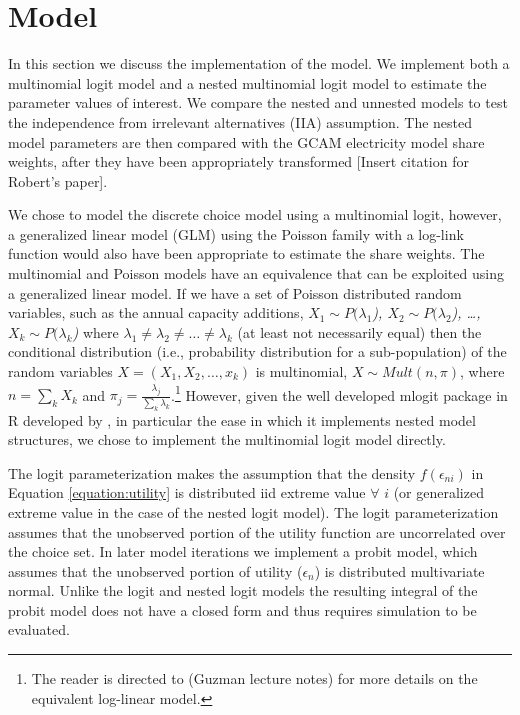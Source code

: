 \documentclass[10pt]{amsart}
\begin{document}
\section{Model}
In this section we discuss the implementation of the model.
We implement both a multinomial logit model and a nested multinomial logit model to estimate the parameter values of interest. 
We compare the nested and unnested models to test the independence from irrelevant alternatives (IIA) assumption.
The nested model parameters are then compared with the GCAM electricity model share weights, after they have been appropriately transformed \parencite{}[Insert citation for Robert's paper].

We chose to model the discrete choice model using a  multinomial logit, however, a generalized linear model (GLM) using the Poisson family with a log-link function would also have been appropriate to estimate the share weights. 
The multinomial and Poisson models have an equivalence that can be exploited using a generalized linear model.
If we have a set of Poisson distributed random variables, such as the annual capacity additions, \textit{$X_1 \sim P(\lambda_1$), $X_2 \sim P(\lambda_2$), \ldots, $X_k \sim P(\lambda_k$)} where $\lambda_1 \neq \lambda_2 \neq \ldots \neq \lambda_k$ (at least not necessarily equal) then the conditional distribution (i.e., probability distribution for a sub-population) of the random variables \textit{$X = (X_1, X_2, \ldots, x_k)$} is multinomial, $X \sim Mult(n, \pi)$, where \textit{$n = \sum_k X_k$} and \textit{$\pi_j = \frac{\lambda_j}{\sum_k \lambda_k}$}.\footnote{The reader is directed to \cite{} (Guzman lecture notes) for more details on the equivalent log-linear model.}
However, given the well developed mlogit package in R developed by \cite{mlogit2013}, in particular the ease in which it implements nested model structures, we chose to implement the multinomial logit model directly. 

The logit parameterization makes the assumption that the density $f(\epsilon_{ni})$ in Equation \ref{equation:utility} is distributed iid extreme value $\forall$ $i$ (or generalized extreme value in the case of the nested logit model). 
The logit parameterization assumes that the unobserved portion of the utility function are uncorrelated over the choice set. 
In later model iterations we implement a probit model, which assumes that the unobserved portion of utility ($\epsilon_n$) is distributed multivariate normal.
Unlike the logit and nested logit models the resulting integral of the probit model does not have a closed form and thus requires simulation to be evaluated.   
\end{document}
